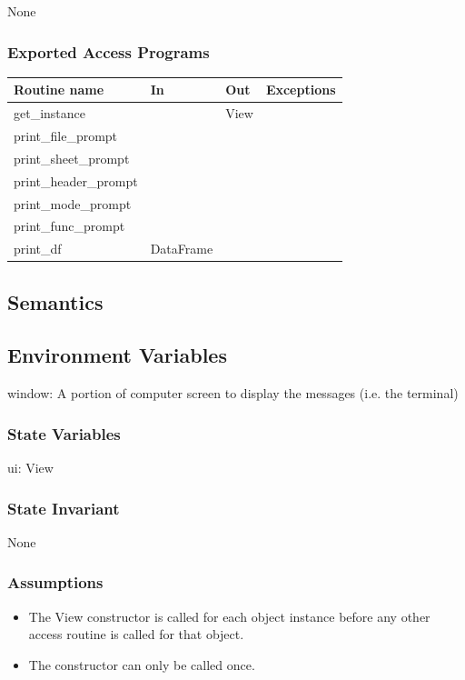 \documentclass[12pt]{article}
\begin{document}
None

\subsubsection* {Exported Access Programs}

\begin{tabular}{| l | l | l | p{5cm} |}
  \hline
  \textbf{Routine name} & \textbf{In} & \textbf{Out} & \textbf{Exceptions}\\
  \hline
  get\_instance &  & View & \\
  \hline
  print\_file\_prompt & &  & \\
  \hline
  print\_sheet\_prompt & & & \\
  \hline
  print\_header\_prompt & & & \\
  \hline
  print\_mode\_prompt & & & \\
  \hline
  print\_func\_prompt & & & \\
  \hline
  print\_df & DataFrame & & \\
  \hline

\end{tabular}

\subsection* {Semantics}

\subsection*{Environment Variables}

window: A portion of computer screen to display the messages (i.e. the terminal)

\subsubsection* {State Variables}

ui: View

\subsubsection* {State Invariant}

None

\subsubsection* {Assumptions}

\begin{itemize}
  \item The View constructor is called for each object instance before any 
  other access routine is called for that object.  
  \item The constructor can only be called once.
\end{itemize}
\end{document}

